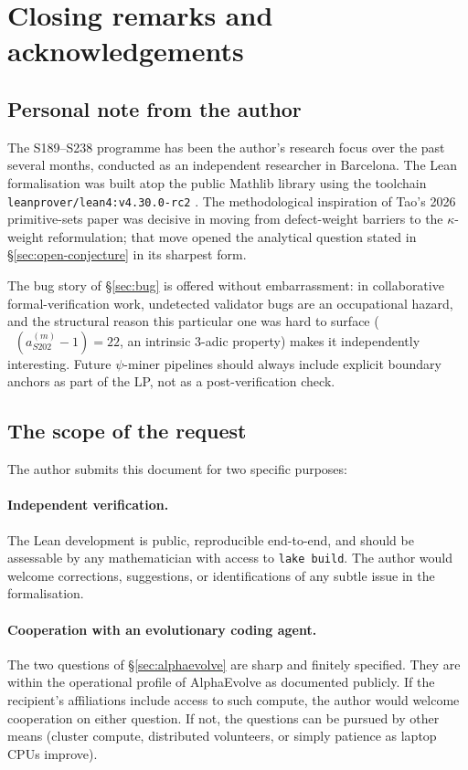 \documentclass[11pt,a4paper]{article}
\theoremstyle{plain}
\theoremstyle{definition}
\newcommand{\aSat}{a_{S202}^{(m)}}
\DeclareMathOperator{\nuthree}{\nu_3}
\begin{document}
\section{Closing remarks and acknowledgements}\label{app:closing}

\subsection*{Personal note from the author}

The S189--S238 programme has been the author's
research focus over the past several months, conducted as an
independent researcher in Barcelona. The Lean formalisation was
built atop the public Mathlib library
\cite{mathlib} using the toolchain \texttt{leanprover/lean4:v4.30.0-rc2}
\cite{lean4}. The methodological inspiration of Tao's 2026
primitive-sets paper was decisive in moving from defect-weight
barriers to the $\kappa$-weight reformulation; that move opened
the analytical question stated in
\S\ref{sec:open-conjecture} in its sharpest form.

The bug story of \S\ref{sec:bug} is offered without embarrassment:
in collaborative formal-verification work, undetected validator
bugs are an occupational hazard, and the structural reason this
particular one was hard to surface
($\nuthree(\aSat - 1) = 22$, an intrinsic 3-adic property)
makes it independently interesting. Future $\psi$-miner pipelines
should always include explicit boundary anchors as part of the
LP, not as a post-verification check.

\subsection*{The scope of the request}

The author submits this document for two specific purposes:

\paragraph{Independent verification.}
The Lean development is public, reproducible end-to-end, and
should be assessable by any mathematician with access to
\texttt{lake build}. The author would welcome corrections,
suggestions, or identifications of any subtle issue in the
formalisation.

\paragraph{Cooperation with an evolutionary coding agent.}
The two questions of \S\ref{sec:alphaevolve} are sharp and
finitely specified. They are within the operational profile of
AlphaEvolve as documented publicly. If the recipient's
affiliations include access to such compute, the author would
welcome cooperation on either question. If not, the questions
can be pursued by other means (cluster compute, distributed
volunteers, or simply patience as laptop CPUs improve).
\end{document}
